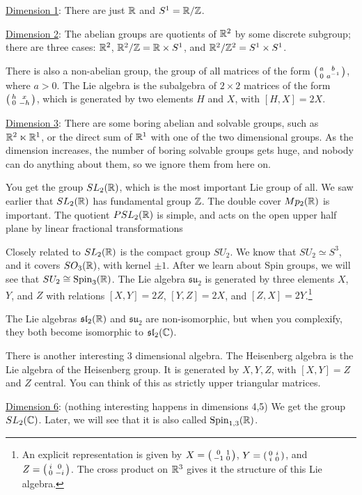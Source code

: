  \underline{Dimension 1}: There are just $\mathbb{R}$ and $S^1 = \mathbb{R}/\mathbb{Z}$.

 \underline{Dimension 2}: The abelian groups are quotients of $\mathbb{R}^2$ by some discrete
 subgroup; there are three cases: $\mathbb{R}^2$, $\mathbb{R}^2/\mathbb{Z} = \mathbb{R}\times S^1$, and
 $\mathbb{R}^2/\mathbb{Z}^2 = S^1\times S^1$.

 There is also a non-abelian group, the group of all matrices of the form $\left( \begin{smallmatrix} a & b \\ 0 & a^{-1} \end{smallmatrix} \right)$, where $a>0$. The Lie algebra is the subalgebra of $2\times 2$ matrices
 of the form $\left( \begin{smallmatrix} h & x \\ 0 & -h \end{smallmatrix} \right)$, which is generated by two elements $H$ and $X$, with
 $[H,X]=2X$.

 \underline{Dimension 3}: There are some boring abelian and solvable groups, such as
 $\mathbb{R}^2\ltimes \mathbb{R}^1$, or the direct sum of $\mathbb{R}^1$ with one of the two dimensional
 groups. As the dimension increases, the number of boring solvable groups gets huge,
 and nobody can do anything about them, so we ignore them from here on.

 You get the group $SL_2(\mathbb{R})$, which is the most important Lie group of all. We saw
 earlier that $SL_2(\mathbb{R})$ has fundamental group $\mathbb{Z}$. The double cover $Mp_2(\mathbb{R})$ is
 important. The quotient $PSL_2(\mathbb{R})$ is simple, and acts on the open upper half plane
 by linear fractional transformations

 Closely related to $SL_2(\mathbb{R})$ is the compact group $SU_2$. We know that $SU_2\simeq
 S^3$, and it covers $SO_3(\mathbb{R})$, with kernel $\pm 1$. After we learn about Spin
 groups, we will see that $SU_2 \cong \operatorname{Spin}_3(\mathbb{R})$. The Lie algebra $\mathfrak{su}_2$
 is generated by three elements $X$, $Y$, and $Z$ with relations $[X,Y]=2Z$,
 $[Y,Z]=2X$, and $[Z,X]=2Y$.\footnote{An explicit representation is given by
 $X=\left( \begin{smallmatrix} 0 & 1 \\ -1 & 0 \end{smallmatrix} \right)$, $Y=\left( \begin{smallmatrix} 0 & i \\ i & 0 \end{smallmatrix} \right)$, and $Z=\left( \begin{smallmatrix} i & 0 \\ 0 & -i \end{smallmatrix} \right)$. The cross product on
 $\mathbb{R}^3$ gives it the structure of this Lie algebra.}

 The Lie algebras $\mathfrak{sl}_2(\mathbb{R})$ and
 $\mathfrak{su}_2$ are non-isomorphic, but when you complexify, they both become
 isomorphic to $\mathfrak{sl}_2(\mathbb{C})$.

 There is another interesting 3 dimensional algebra. The Heisenberg algebra is the Lie
 algebra of the Heisenberg group. It is generated by $X,Y,Z$, with $[X,Y]=Z$ and $Z$
 central. You can think of this as strictly upper triangular matrices.

 \underline{Dimension 6}: (nothing interesting happens in dimensions 4,5) We get the
 group $SL_2(\mathbb{C})$. Later, we will see that it is also called $\operatorname{Spin}_{1,3}(\mathbb{R})$.

